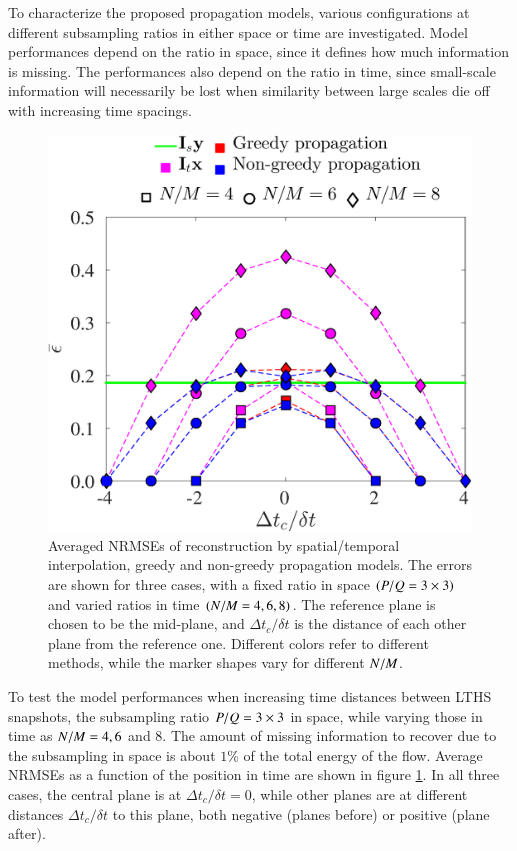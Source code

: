 To characterize the proposed propagation models, various configurations at different subsampling ratios in either space or time are investigated. Model performances depend on the ratio in space, since it defines how much information is missing. The performances also depend on the ratio in time, since small-scale information will necessarily be lost when similarity between large scales die off with increasing time spacings. 

\begin{figure}[t]
	\centering
	\includegraphics[width=0.65\columnwidth]{./images/NLM/interpdiff/NLmean_interps_NRMSE_vary_timespacing.eps}		
	\caption{\label{fig:NLmean_interps_NRMSE_vary_timespacing} Averaged NRMSEs of reconstruction by spatial/temporal interpolation, greedy and non-greedy propagation models. The errors are shown for three cases, with a fixed ratio in space $ (P/Q = 3 \times 3) $ and varied ratios in time $(N/M=4,6,8) $. The reference plane is chosen to be the mid-plane, and $ \Delta t_c/\delta t $ is the distance of each other plane from the reference one. Different colors refer to different methods, while the marker shapes vary for different $ N/M $.}
\end{figure}

To test the model performances when increasing time distances between LTHS snapshots, the subsampling ratio $ P/Q=3 \times 3 $ in space, while varying those in time as $ N/M=4,6 $ and $ 8 $. The amount of missing information to recover due to the subsampling in space is about $ 1 \% $ of the total energy of the flow. Average NRMSEs as a function of the position in time are shown in figure \ref{fig:NLmean_interps_NRMSE_vary_timespacing}. In all three cases, the central plane is at $ \Delta t_c/\delta t = 0 $, while other planes are at different distances $ \Delta t_c/\delta t$ to this plane, both negative (planes before) or positive (plane after). 


